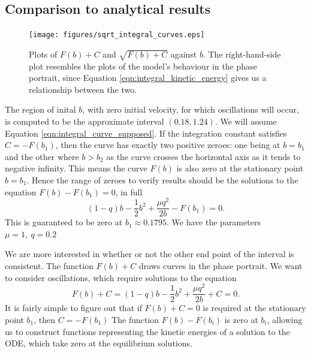 \documentclass{article}
\begin{document}
\subsection{Comparison to analytical results}

\begin{figure}
    \centering
    \texttt{[image: figures/sqrt\_integral\_curves.eps]}
    \caption{
        Plots of $F(b)+C$ and $\sqrt{F(b)+C}$ against $b$.
        The right-hand-side plot resembles the plots of the model's behaviour in the phase portrait,
        since Equation \ref{eqn:integral_kinetic_energy} gives us a relationship between the two.
    }
    \label{fig:sqrt_curves}
\end{figure}
The region of inital $b$, with zero initial velocity, for which oscillations will occur,
is computed to be the approximate interval $(0.18,1.24)$.
We will assume Equation \ref{eqn:integral_curve_supposed}.
If the integration constant satisfies $C = -F(b_1)$,
then the curve has exactly two positive zeroes:
one being at $b=b_1$ and the other where $b>b_2$ as the curve crosses the horizontal axis as it tends to negative infinity.
This means the curve \(F(b)\) is also zero at the stationary point \(b = b_1\).
Hence the range of zeroes to verify results should be the solutions to the equation $F(b)-F(b_1)=0$, in full
\begin{equation}
    (1-q)b - \frac{1}{2}b^2 + \frac{\mu q^2}{2b} - F(b_1) = 0.
    \label{eqn:integral_curves_zeroes_explicit}
\end{equation}
This is guaranteed to be zero at $b_1 \approx 0.1795$.
We have the parameters \(\mu = 1,~ q = 0.2\)

We are more interested in whether or not the other end point of the interval is consistent.
The function \(F(b) + C\) draws curves in the phase portrait.
We want to consider oscillations, which require solutions to the equation
\begin{equation}
    F(b) + C = (1-q)b - \frac{1}{2}b^2 + \frac{\mu q^2}{2b} + C = 0.
\end{equation}
It is fairly simple to figure out that if \(F(b)+C=0\) is required at the stationary point \(b_1\),
then \(C = -F(b_1)\)
The function \(F(b)-F(b_i)\) is zero at $b_i$, allowing us to construct functions representing the kinetic energies of a solution to the ODE,
which take zero at the equilibrium solutions.



\end{document}
